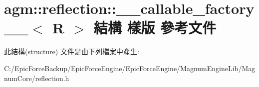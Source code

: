 \hypertarget{structagm_1_1reflection_1_1____callable__factory____}{}\section{agm\+:\+:reflection\+:\+:\+\_\+\+\_\+callable\+\_\+factory\+\_\+\+\_\+$<$ R $>$ 結構 樣版 參考文件}
\label{structagm_1_1reflection_1_1____callable__factory____}


此結構(structure) 文件是由下列檔案中產生\+:\begin{DoxyCompactItemize}
\item 
C\+:/\+Epic\+Force\+Backup/\+Epic\+Force\+Engine/\+Epic\+Force\+Engine/\+Magnum\+Engine\+Lib/\+Magnum\+Core/reflection.\+h\end{DoxyCompactItemize}
